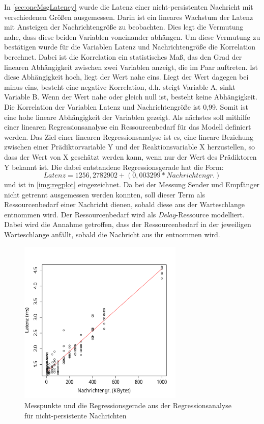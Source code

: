 In \autoref{sec:oneMsgLatency} wurde die Latenz einer nicht-persistenten Nachricht mit verschiedenen Größen ausgemessen. Darin ist ein lineares Wachstum der Latenz mit Ansteigen der Nachrichtengröße zu beobachten. Dies legt die Vermutung nahe, dass diese beiden Variablen voneinander abhängen. Um diese Vermutung zu bestätigen wurde für die Variablen Latenz und Nachrichtengröße die Korrelation berechnet. Dabei ist die Korrelation ein statistisches Maß, das den Grad der linearen Abhängigkeit zwischen zwei Variablen anzeigt, die im Paar auftreten. Ist diese Abhängigkeit hoch, liegt der Wert nahe eins. Liegt der Wert dagegen bei minus eins, besteht eine negative Korrelation, d.h. steigt Variable A, sinkt Variable B. Wenn der Wert nahe oder gleich null ist, besteht keine Abhängigkeit. Die Korrelation der Variablen Latenz und Nachrichtengröße ist 0,99. Somit ist eine hohe lineare Abhängigkeit der Variablen gezeigt. Als nächstes soll mithilfe einer linearen Regressionsanalyse ein Ressourcenbedarf für das Modell definiert werden. Das Ziel einer linearen Regressionsanalyse ist es, eine lineare Beziehung zwischen einer Prädiktorvariable Y und der Reaktionsvariable X herzustellen, so dass der Wert von X geschätzt werden kann, wenn nur der Wert des Prädiktoren Y bekannt ist. Die dabei entstandene Regressionsgerade hat die Form: \[Latenz = 1256,2782902 + (0,003299 * Nachrichtengr.)\] und ist in \autoref{img:regplot} eingezeichnet. Da bei der Messung Sender und Empfänger nicht getrennt ausgemessen werden konnten, soll dieser Term als Ressourcenbedarf einer Nachricht dienen, sobald diese aus der Warteschlange entnommen wird. Der Ressourcenbedarf wird als \emph{Delay}-Ressource modelliert. Dabei wird die Annahme getroffen, dass der Ressourcenbedarf in der jeweiligen Warteschlange anfällt, sobald die Nachricht aus ihr entnommen wird. 
\begin{figure}
\center
  \includegraphics[width=0.7\textwidth]{images/modelling/oneMsgRegression.pdf}
  \caption{Messpunkte und die Regressionsgerade aus der Regressionsanalyse für nicht-persistente Nachrichten}
  \label{img:regplot}
\end{figure}

